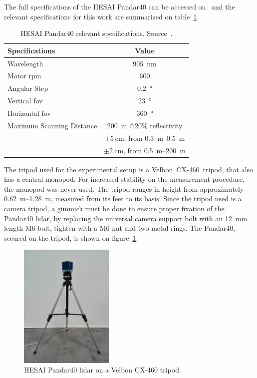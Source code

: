The full specifications of the HESAI Pandar40 can be accessed on~\cite{Pandar40UserGuide} and the relevant specifications for this work are summarized on table~\ref{tab:pandar40-specs}.

\begin{table}[H]
	\centering
	\renewcommand{\arraystretch}{1.2}
	\begin{tabular}{@{}p{6cm}c@{}}
		\toprule
		Specifications & Value \\
		\midrule
		Wavelength & \SI{905}{\nano\meter} \\
		Motor \ac{rpm} & 600 \\
		Angular Step & \SI{0.2}{\degree} \\
		Vertical \ac{fov} & \SI{23}{\degree} \\
		Horizontal \ac{fov} & \SI{360}{\degree} \\
		Maximum Scanning Distance & \SI{200}{\meter} @20\% reflectivity \\
																					 & $\pm \SI{5}{\centi\meter}$, from \SIrange{0.3}{0.5}{\meter} \\
		\rowcolor{white} \multirow{-2}{*}{Measurement Accuracy} & $\pm \SI{2}{\centi\meter}$, from \SIrange{0.5}{200}{\meter} \\
		\bottomrule
	\end{tabular}
	\caption{HESAI Pandar40 relevant specifications. Source~\cite{Pandar40UserGuide}.}
	\label{tab:pandar40-specs}
\end{table}

The tripod used for the experimental setup is a Velbon\cp~CX-460\texttrademark~tripod, that also has a central monopod. For increased stability on the measurement procedure, the monopod was never used. The tripod ranges in height from approximately \SIrange{0.62}{1.28}{\meter}, measured from its feet to its basis. Since the tripod used is a camera tripod, a gimmick must be done to ensure proper fixation of the Pandar40 \ac{lidar}, by replacing the universal camera support bolt with an \SI{12}{\milli\meter} length M6 bolt, tighten with a M6 nut and two metal rings. The Pandar40, secured on the tripod, is shown on figure~\ref{fig:pandar40-on-tripod}.

\begin{figure}[H]
	\centering
	\includegraphics[width=0.4\textwidth]{img/experimental-setup/pandar40-on-tripod.jpg}
	\caption{HESAI Pandar40 \ac{lidar} on a Velbon CX-460 tripod.}
	\label{fig:pandar40-on-tripod}
\end{figure}

